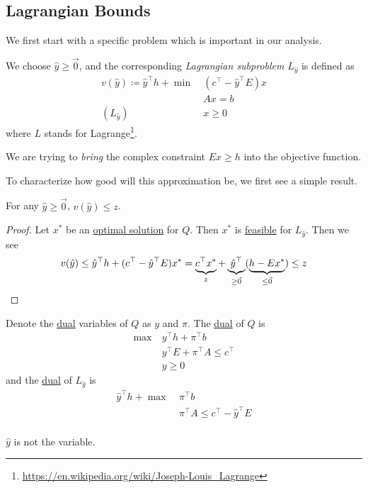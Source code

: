 \subsection{Lagrangian Bounds}
We first start with a specific problem which is important in our analysis.
\begin{definition}\label{def:Lagrangian-subproblem}
	We choose \(\hat{y}\geq \vec{0}\), and the corresponding \emph{Lagrangian subproblem} \(L_{\hat{y}}\) is defined as
	\[
		\begin{aligned}
			v(\hat{y})\coloneqq \hat{y}^{\top}h + \min~ & (c^{\top} - \hat{y}^{\top}E)x \\
			                                            & Ax = b                        \\
			(L_{\hat{y}})\quad                          & x\geq 0
		\end{aligned}
	\]
	where \(L\) stands for Lagrange\footnote{\url{https://en.wikipedia.org/wiki/Joseph-Louis_Lagrange}}.
\end{definition}

\begin{intuition}
	We are trying to \emph{bring} the complex constraint \(Ex\geq h\) into the objective function.
\end{intuition}

To characterize how good will this approximation be, we first see a simple result.
\begin{lemma}\label{lma:lec18-1}
	For any \(\hat{y}\geq \vec{0}\), \(v(\hat{y})\leq z\).
\end{lemma}
\begin{proof}
	Let \(x^{\ast}\) be an \hyperref[def:optimal-solution]{optimal solution} for \(Q\). Then \(x^{\ast}\) is \hyperref[def:feasible-solution]{feasible} for \(L_{\hat{y}}\).
	Then we see
	\[
		v(\hat{y}) \leq \hat{y}^{\top}h + (c^{\top} - \hat{y}^{\top} E )x^{\ast} = \underbrace{\vphantom{\hat{y}^{\top}}c^{\top}x^{\ast}}_{z} + \underbrace{\hat{y}^{\top}}_{\geq \vec{0}}(\underbrace{\vphantom{\hat{y}^{\top}}h - Ex^{\ast}}_{\leq \vec{0}}) \leq z
	\]
\end{proof}

Denote the \hyperref[def:dual]{dual} variables of \(Q\) as \(y\) and \(\pi\). The \hyperref[def:dual]{dual} of \(Q\) is
\[
	\begin{aligned}
		\max~ & y^{\top}h + \pi^{\top} b             \\
		      & y^{\top}E + \pi^{\top}A\leq c^{\top} \\
		      & y\geq 0
	\end{aligned}
\]
and the \hyperref[def:dual]{dual} of \(L_{\hat{y}}\) is
\[
	\begin{aligned}
		\hat{y}^{\top}h + \max~ & \pi^{\top}b                                \\
		                        & \pi^{\top}A\leq c^{\top} - \hat{y}^{\top}E \\
	\end{aligned}
\]
\begin{note}
	\(\hat{y}\) is not the variable.
\end{note}

